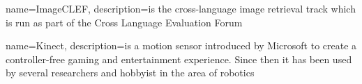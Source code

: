 
{
  name={ImageCLEF},
  description={is the cross-language image retrieval track which is run as part of the Cross Language Evaluation Forum}
}

{
  name={Kinect},
  description={is a motion sensor introduced by Microsoft to create a controller-free gaming and entertainment experience. Since then it has been used by several researchers and hobbyist in the area of robotics}
}

